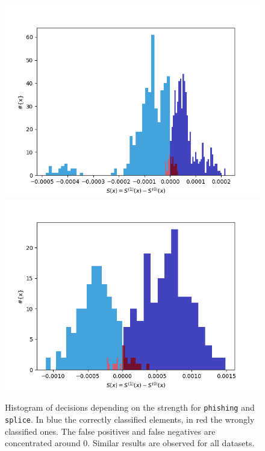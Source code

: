 \documentclass[preprint,12pt]{elsarticle}
\theoremstyle{definition}
\begin{document}
\begin{figure}[!h]
\centering
\includegraphics[scale=0.4]{img/phishing.png}
\includegraphics[scale=0.4]{img/splice.png}
\caption{Histogram of decisions depending on the strength for \texttt{phishing} and \texttt{splice}. In blue the correctly classified elements, in red the wrongly classified ones. The false positives and false negatives are concentrated around 0. Similar results are observed for all datasets.}
\label{fig:phishing_histogram}
\end{figure}
\end{document}
